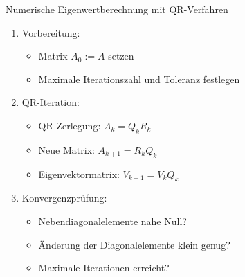 \begin{KR}{Numerische Eigenwertberechnung mit QR-Verfahren}
\begin{enumerate}
    \item Vorbereitung:
    \begin{itemize}
        \item Matrix $A_0 := A$ setzen
        \item Maximale Iterationszahl und Toleranz festlegen
    \end{itemize}
    
    \item QR-Iteration:
    \begin{itemize}
        \item QR-Zerlegung: $A_k = Q_kR_k$
        \item Neue Matrix: $A_{k+1} = R_kQ_k$
        \item Eigenvektormatrix: $V_{k+1} = V_kQ_k$
    \end{itemize}
    
    \item Konvergenzprüfung:
    \begin{itemize}
        \item Nebendiagonalelemente nahe Null?
        \item Änderung der Diagonalelemente klein genug?
        \item Maximale Iterationen erreicht?
    \end{itemize}
\end{enumerate}
\end{KR}

